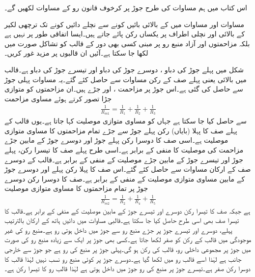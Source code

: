 اس کتاب میں ہم مساوات  کی طرح جوڑ پر کرخوف قانون رو کے مساوات لکھیں گے۔

مساوات  اور مساوات  میں    کے بالائی بائیں کونے سے نچلے دائیں کونے تک ترچھی لکیر کے بالائی اور نچلی اطراف پر یکساں رکن پائے جاتے ہیں۔ایسا اتفاقی طور پر نہیں ہے  بلکہ مزاحمتوں اور آزاد منبع رو پر مبنی کسی بھی دور کے  قالب کو تشاکل صورت میں لکھا جا سکتا ہے۔آئیں ان قالبوں پر مزید غور کریں۔

شکل  میں پہلے جوڑ کی دباو ، دوسرے  جوڑ کی دباو  اور تیسرے جوڑ کی دباو  ہے۔قالب میں بالائی یعنی پہلے صف کے رکن مساوات  سے حاصل کئے گئے۔یہ مساوات پہلی جوڑ سے حاصل کی گئی ہے۔اس جوڑ پر مزاحمت ،  اور  جڑے ہیں۔ان مزاحمتوں کو متوازی جڑا تصور کرتے ہوئے مساوی مزاحمت 
\begin{align*}
\frac{1}{R_{m1}}=\frac{1}{R_1}+\frac{1}{R_2}+\frac{1}{R_3}
\end{align*}
سے حاصل کیا جا سکتا ہے جہاں  کو مساوی متوازی موصلیت  کہا جاتا ہے۔یوں  قالب کے پہلے صف کا پہلا (بایاں) رکن  پہلے جوڑ سے  جڑے تمام مزاحمتوں کا مساوی متوازی موصلیت   ہے۔اسی صف کا دوسرا رکن  پہلے جوڑ اور دوسرے جوڑ کے مابین جڑے مزاحمت کی موصلیت کا منفی  کے برابر ہے۔اسی طرح پہلے صف کا تیسرا رکن، پہلے جوڑ اور تیسرے جوڑ کے مابین جڑے موصلیت کے منفی  کے برابر ہے۔قالب کے دوسرے صف کے ارکان مساوات  سے حاصل کئے گئے۔اس صف کا پہلا رکن پہلے اور دوسرے جوڑ کے مابین مساوی متوازی موصلیت کے منفی  کے برابر ہے۔صف کا دوسرا رکن دوسرے جوڑ پر تمام مزاحمتوں کا مساوی متوازی موصلیت 
\begin{align*}
\frac{1}{R_{m2}}=\frac{1}{R_2}+\frac{1}{R_4}+\frac{1}{R_5}
\end{align*}
ہے جبکہ صف کا تیسرا رکن دوسرے اور تیسرے جوڑ کے مابین موصلیت کے منفی  کے برابر ہے۔قالب کا تیسرا صف بھی اسی طرح حاصل کیا جا سکتا ہے۔قالبی مساوات میں دائیں ہاتھ  کے ارکان بالترتیب پہلے، دوسرے اور تیسرے جوڑ پر جڑے منبع رو سے جوڑ میں داخل ہوتی رو ہے۔منبع رو کی غیر موجودگی میں قالب کے رکن کو صفر لکھا جاتا ہے۔کسی بھی جوڑ پر ایک سے زیادہ منبع رو کی صورت میں جوڑ پر مجموعی داخلی رو، قالب کی رکن ہو گی۔پہلی جوڑ پر منبع کی رو  ہے جو جوڑ سے خارجی جانب ہے لہٰذا اسے قالب رو میں  لکھا گیا ہے۔دوسرے جوڑ پر کوئی منبع رو نسب نہیں لہٰذا قالب کا دوسرا رکن صفر ہے۔تیسرے جوڑ پر منبع  کی رو جوڑ میں داخل ہوتی ہے لہٰذا قالب رو کا تیسرا رکن  ہے۔ 

